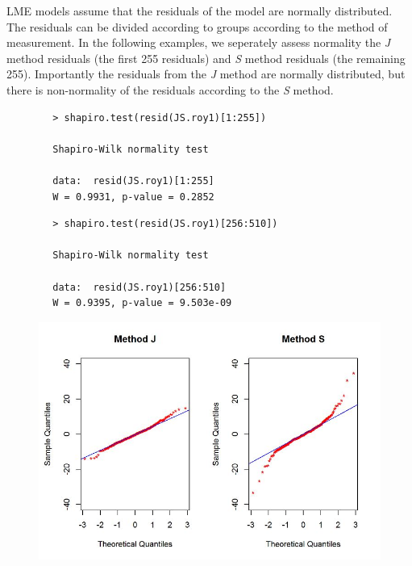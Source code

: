 \documentclass[12pt, a4paper]{report}
\theoremstyle{plain}
\theoremstyle{definition}
\theoremstyle{remark}
\begin{document}
	LME models assume that the residuals of the model are normally distributed.  The residuals can be divided according to groups according to the method of measurement. In the following examples, we seperately assess normality the \textit{J} method residuals (the first 255 residuals) and \textit{S} method residuals (the remaining 255). Importantly the residuals from the \textit{J} method are normally distributed, but there is non-normality of the residuals according to the \textit{S} method.
	\begin{framed}
		\begin{verbatim}
		> shapiro.test(resid(JS.roy1)[1:255])
		
		Shapiro-Wilk normality test
		
		data:  resid(JS.roy1)[1:255]
		W = 0.9931, p-value = 0.2852
		\end{verbatim}
	\end{framed}
	
	\begin{framed}
		\begin{verbatim}
		> shapiro.test(resid(JS.roy1)[256:510])
		
		Shapiro-Wilk normality test
		
		data:  resid(JS.roy1)[256:510]
		W = 0.9395, p-value = 9.503e-09
		\end{verbatim}
	\end{framed}
	\begin{figure}[h!]
		\centering
		\includegraphics[width=0.9\linewidth]{images/Resid-newplot2}
		
	\end{figure}
	
	
\end{document}
